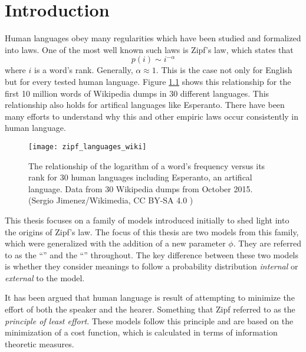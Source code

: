 \chapter{Introduction}
\label{cha:introduction}

Human languages obey many regularities which have been studied and formalized into laws.
One of the most well known such laws is Zipf's law, which states that
\begin{equation}
  \label{eq:zipf_law}
  p(i) \sim i^{-\alpha}
\end{equation}
where $i$ is a word's rank.
Generally, $\alpha \approx 1$. \cite{Zipf1949a}
This is the case not only for English but for every tested human language. \cite{Mehri2017}
Figure \ref{fig:zipf_languages_wiki} shows this relationship for the first 10 million words of Wikipedia dumps in 30 different languages.
This relationship also holds for artifical languages like Esperanto.
There have been many efforts to understand why this and other empiric laws occur consistently in human language.

\begin{figure}
  \centering
  \texttt{[image: zipf\_languages\_wiki]}
  \caption{
    The relationship of the logarithm of a word's frequency versus its rank for 30 human languages including Esperanto, an artifical language.
    Data from 30 Wikipedia dumps from October 2015.\\
    (Sergio Jimenez/Wikimedia, CC BY-SA 4.0 \cite{Jimenez2015a})}
  \label{fig:zipf_languages_wiki}
\end{figure}

This thesis focuses on a family of models \cite{Ferrer2007a} introduced initially to shed light into the origins of Zipf's law. \cite{Ferrer2005a} \cite{Ferrer2003a}
The focus of this thesis are two models from this family, which were generalized with the addition of a new parameter $\phi$. \cite{Ferrer2018a}
They are referred to as the ``\firstmodel{}'' and the ``\secondmodel{}'' throughout.
The key difference between these two models is whether they consider meanings to follow a probability distribution \emph{internal} or \emph{external} to the model.

It has been argued \cite{Ferrer2003a} \cite{Zipf1949a} that human language is result of attempting to minimize the effort of both the speaker and the hearer. Something that Zipf referred to as the \emph{principle of least effort}. These models follow this principle and are based on the minimization of a cost function, which is calculated in terms of information theoretic measures.

